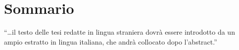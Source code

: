 \newcommand{\estrattoname}{Sommario}

\begingroup
\let\clearpage\relax
\let\cleardoublepage\relax
\let\cleardoublepage\relax

\chapter*{Sommario}
\enquote{\ldots il testo delle tesi redatte in lingua straniera dovrà essere introdotto da un
ampio estratto in lingua italiana, che andrà collocato dopo l’abstract.}

\endgroup

